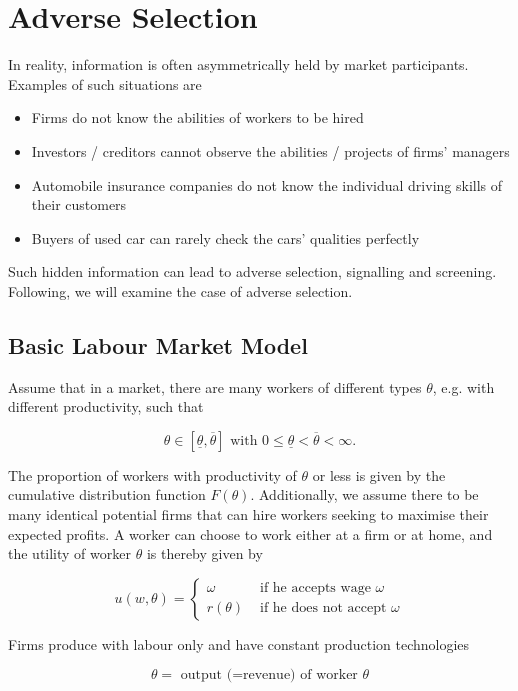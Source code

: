 \documentclass[11pt]{article}
\begin{document}
\section{Adverse Selection}

In reality, information is often asymmetrically held by market participants. Examples of such situations are

\begin{itemize}
	\item Firms do not know the abilities of workers to be hired
	\item Investors / creditors cannot observe the abilities / projects of firms' managers
	\item Automobile insurance companies do not know the individual driving skills of their customers
	\item Buyers of used car can rarely check the cars' qualities perfectly
\end{itemize}

Such hidden information can lead to adverse selection, signalling and screening. Following, we will examine the case of adverse selection.

\subsection{Basic Labour Market Model}

Assume that in a market, there are many workers of different types $\theta$, e.g. with different productivity, such that

	$$ \theta \in [\underline{\theta}, \overline{\theta}] \text{ with }0 \leq \underline{\theta} < \overline{\theta} < \infty.  $$
	
The proportion of workers with productivity of $\theta$ or less is given by the cumulative distribution function $F(\theta)$. Additionally, we assume there to be many identical potential firms that can hire workers seeking to maximise their expected profits. A worker can choose to work either at a firm or at home, and the utility of worker $\theta$ is thereby given by

	$$ u(w, \theta) = \begin{cases} \omega & \text{ if he accepts wage } \omega \\ r(\theta) & \text{ if he does not accept } \omega \end{cases} $$
	
Firms produce with labour only and have constant production technologies

	$$ \theta = \text{ output (=revenue) of worker } \theta $$
	
\end{document}
